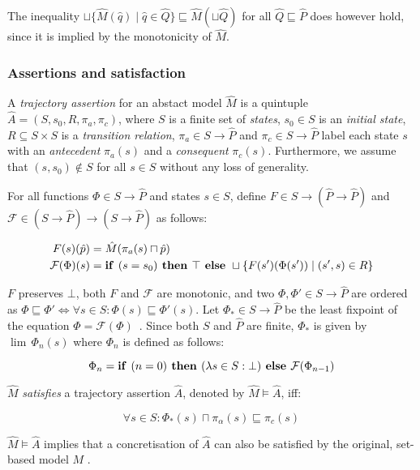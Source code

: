 \noindent The inequality $\sqcup \{ \hat M(\hat q) \mid \hat q \in \hat Q \} \sqsubseteq \hat M(\sqcup \hat Q)$ for all $\hat Q \sqsubseteq \hat P$ does however hold, since it is implied by the monotonicity of $\hat M$.

\subsubsection{Assertions and satisfaction}

A \textit{trajectory assertion} for an abstact model $\hat M$ is a quintuple $\hat A = (S,s_{0},R,\pi_{a},\pi_{c})$, where $S$ is a finite set of \textit{states}, $s_{0} \in S$ is an \textit{initial state}, $R \subseteq S \times S$ is a \textit{transition relation}, $\pi_{a} \in S \rightarrow \hat P$ and $\pi_{c} \in S \rightarrow \hat P$ label each state $s$ with an \textit{antecedent} $\pi_{a}(s)$ and a \textit{consequent} $\pi_{c}(s)$. Furthermore, we assume that $(s,s_{0}) \notin S$ for all $s \in S$ without any loss of generality.

For all functions $\Phi \in S \rightarrow \hat P$ and states $s \in S$, define $F \in S \rightarrow (\hat P \rightarrow \hat P)$ and $\mathcal{F} \in (S \rightarrow \hat P) \rightarrow (S \rightarrow \hat P)$ as follows:

\begin{align}
F(s)(\hat p) &= \hat M(\pi_{a}(s) \sqcap \hat p) \\
\mathcal{F}(\Phi)(s) &= \textrm{\textbf{if }} (s = s_{0}) \textrm{\textbf{ then }} \top \textrm{\textbf{ else }} \sqcup \{ F(s')(\Phi(s')) \mid (s',s) \in R \}
\end{align}

\noindent $F$ preserves $\bot$, both $F$ and $\mathcal{F}$ are monotonic, and two $\Phi, \Phi' \in S \rightarrow \hat P$ are ordered as $\Phi \sqsubseteq \Phi' \iff \forall s \in S : \Phi(s) \sqsubseteq \Phi'(s)$. Let $\Phi_{*} \in S \rightarrow \hat P$ be the least fixpoint of the equation $\Phi = \mathcal{F}(\Phi)$~\cite{davey2002}. Since both $S$ and $\hat P$ are finite, $\Phi_{*}$ is given by $\lim \, \Phi_{n}(s)$ where $\Phi_{n}$ is defined as follows:

\begin{equation}
\Phi_{n} = \textrm{\textbf{if }} (n = 0) \textrm{\textbf{ then }} (\lambda s \in S : \bot) \textrm{\textbf{ else }} \mathcal{F}(\Phi_{n-1})
\end{equation}

$\hat M$ \textit{satisfies} a trajectory assertion $\hat A$, denoted by $\hat M \models \hat A$, iff:

\begin{equation}
\forall s \in S : \Phi_{*}(s) \sqcap \pi_{\alpha}(s) \sqsubseteq \pi_{c}(s)
\end{equation}

\noindent $\hat M \models \hat A$ implies that a concretisation of $\hat A$ can also be satisfied by the original, set-based model $M$ \cite{chou1999}.
